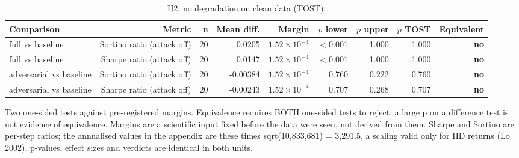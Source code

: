 \begin{table}[htbp]
  \centering
  \caption{H2: no degradation on clean data (TOST).}
  \label{tab:equivalence}
  \begin{tabular}{lrrrrrrrr}
    \toprule
    Comparison & Metric & n & Mean diff. & Margin & $p$ lower & $p$ upper & $p$ TOST & Equivalent \\
    \midrule
    full vs baseline & Sortino ratio (attack off) & 20 & 0.0205 & $1.52\times10^{-4}$ & $<$0.001 & 1.000 & 1.000 & \textbf{no} \\
    full vs baseline & Sharpe ratio (attack off) & 20 & 0.0147 & $1.52\times10^{-4}$ & $<$0.001 & 1.000 & 1.000 & \textbf{no} \\
    adversarial vs baseline & Sortino ratio (attack off) & 20 & -0.00384 & $1.52\times10^{-4}$ & 0.760 & 0.222 & 0.760 & \textbf{no} \\
    adversarial vs baseline & Sharpe ratio (attack off) & 20 & -0.00243 & $1.52\times10^{-4}$ & 0.707 & 0.268 & 0.707 & \textbf{no} \\
    \bottomrule
  \end{tabular}
  \begin{minipage}{\linewidth}\vspace{4pt}\footnotesize Two one-sided tests against pre-registered margins. Equivalence requires BOTH one-sided tests to reject; a large p on a difference test is not evidence of equivalence. Margins are a scientific input fixed before the data were seen, not derived from them. Sharpe and Sortino are per-step ratios; the annualised values in the appendix are these times sqrt(10,833,681) = 3,291.5, a scaling valid only for IID returns (Lo 2002). p-values, effect sizes and verdicts are identical in both units.\end{minipage}
\end{table}
